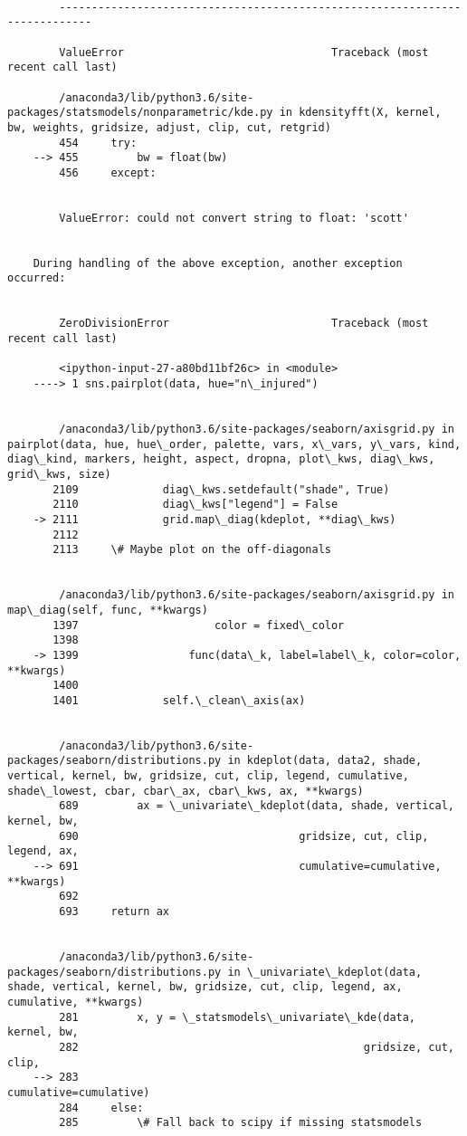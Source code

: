 \documentclass[11pt]{article}
\begin{document}
    \begin{Verbatim}[commandchars=\\\{\}]

        ---------------------------------------------------------------------------

        ValueError                                Traceback (most recent call last)

        /anaconda3/lib/python3.6/site-packages/statsmodels/nonparametric/kde.py in kdensityfft(X, kernel, bw, weights, gridsize, adjust, clip, cut, retgrid)
        454     try:
    --> 455         bw = float(bw)
        456     except:


        ValueError: could not convert string to float: 'scott'

        
    During handling of the above exception, another exception occurred:


        ZeroDivisionError                         Traceback (most recent call last)

        <ipython-input-27-a80bd11bf26c> in <module>
    ----> 1 sns.pairplot(data, hue="n\_injured")
    

        /anaconda3/lib/python3.6/site-packages/seaborn/axisgrid.py in pairplot(data, hue, hue\_order, palette, vars, x\_vars, y\_vars, kind, diag\_kind, markers, height, aspect, dropna, plot\_kws, diag\_kws, grid\_kws, size)
       2109             diag\_kws.setdefault("shade", True)
       2110             diag\_kws["legend"] = False
    -> 2111             grid.map\_diag(kdeplot, **diag\_kws)
       2112 
       2113     \# Maybe plot on the off-diagonals


        /anaconda3/lib/python3.6/site-packages/seaborn/axisgrid.py in map\_diag(self, func, **kwargs)
       1397                     color = fixed\_color
       1398 
    -> 1399                 func(data\_k, label=label\_k, color=color, **kwargs)
       1400 
       1401             self.\_clean\_axis(ax)


        /anaconda3/lib/python3.6/site-packages/seaborn/distributions.py in kdeplot(data, data2, shade, vertical, kernel, bw, gridsize, cut, clip, legend, cumulative, shade\_lowest, cbar, cbar\_ax, cbar\_kws, ax, **kwargs)
        689         ax = \_univariate\_kdeplot(data, shade, vertical, kernel, bw,
        690                                  gridsize, cut, clip, legend, ax,
    --> 691                                  cumulative=cumulative, **kwargs)
        692 
        693     return ax


        /anaconda3/lib/python3.6/site-packages/seaborn/distributions.py in \_univariate\_kdeplot(data, shade, vertical, kernel, bw, gridsize, cut, clip, legend, ax, cumulative, **kwargs)
        281         x, y = \_statsmodels\_univariate\_kde(data, kernel, bw,
        282                                            gridsize, cut, clip,
    --> 283                                            cumulative=cumulative)
        284     else:
        285         \# Fall back to scipy if missing statsmodels



\end{Verbatim}
\end{document}
